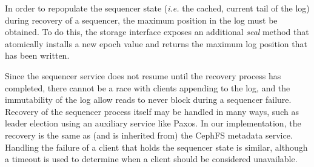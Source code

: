 In order to repopulate the sequencer state ({\it i.e.} the cached, current tail of
the log) during recovery of a sequencer, the maximum position in the log must
be obtained. To do this, the storage interface exposes an additional
\emph{seal} method that atomically installs a new epoch value and returns the
maximum log position that has been written.

Since the sequencer service does not resume until the recovery process has
completed, there cannot be a race with clients appending to the log, and the
immutability of the log allow reads to never block during a sequencer failure.
Recovery of the sequencer process itself may be handled in many ways, such as
leader election using an auxiliary service like Paxos. In our
implementation, the recovery is the same as (and is inherited from) the CephFS
metadata service. Handling the failure of a client that holds the sequencer
state is similar, although a timeout is used to determine when a client should
be considered unavailable.
